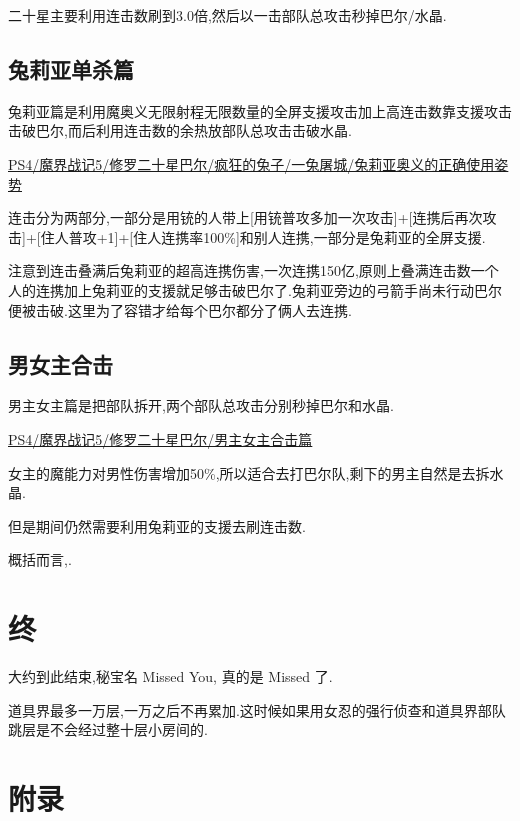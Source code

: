 	二十星主要利用连击数刷到3.0倍,然后以一击部队总攻击秒掉巴尔/水晶.

	\subsection{兔莉亚单杀篇}

	兔莉亚篇是利用魔奥义无限射程无限数量的全屏支援攻击加上高连击数靠支援攻击击破巴尔,而后利用连击数的余热放部队总攻击击破水晶.

	\href{http://www.bilibili.com/video/av2989748/}{PS4/魔界战记5/修罗二十星巴尔/疯狂的兔子/一兔屠城/兔莉亚奥义的正确使用姿势}


	连击分为两部分,一部分是用铳的人带上[用铳普攻多加一次攻击]+[连携后再次攻击]+[住人普攻+1]+[住人连携率100\%]和别人连携,一部分是兔莉亚的全屏支援.

	注意到连击叠满后兔莉亚的超高连携伤害,一次连携150亿,原则上叠满连击数一个人的连携加上兔莉亚的支援就足够击破巴尔了.兔莉亚旁边的弓箭手尚未行动巴尔便被击破.这里为了容错才给每个巴尔都分了俩人去连携.

	\subsection{男女主合击}
	男主女主篇是把部队拆开,两个部队总攻击分别秒掉巴尔和水晶.
	
	\href{http://www.bilibili.com/video/av2995573/}{PS4/魔界战记5/修罗二十星巴尔/男主女主合击篇}

	女主的魔能力对男性伤害增加50\%,所以适合去打巴尔队,剩下的男主自然是去拆水晶.

	但是期间仍然需要利用兔莉亚的支援去刷连击数.

	概括而言,{\color{red}{二十星是利用连击+部队总攻击}}.


	\newpage
	\section{终}

	大约到此结束,秘宝名 Missed You, 真的是 Missed 了.

	道具界最多一万层,一万之后不再累加.这时候如果用女忍的强行侦查和道具界部队跳层是不会经过整十层小房间的.

	\newpage
	\section*{附录}

